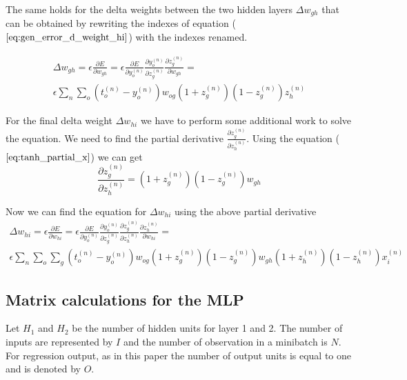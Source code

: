 The same holds for the delta weights between the two hidden layers $\Delta w_{gh}$ that can be obtained by rewriting the indexes of equation ($\ref{eq:gen_error_d_weight_hi}$) with the indexes renamed. 

\begin{multline} \label{eq:gen_dual_error_d_weight_gh}
\Delta w_{gh} = 
\epsilon \frac{\partial{E}}{\partial{w_{gh}}} = 
\epsilon \frac{\partial{E}}{\partial{y^{(n)}_{o}}} \frac{\partial{y^{(n)}_{o}}}{\partial{z^{(n)}_{g}}} \frac{\partial{z^{(n)}_{g}}}{\partial{w_{gh}}} = \\
\epsilon \sum_{n} \sum_{o}(t^{(n)}_{o}-y^{(n)}_{o}) w_{og} (1+z^{(n)}_{g})(1-z^{(n)}_{g}) z^{(n)}_{h}
\end{multline}

For the final delta weight  $\Delta w_{hi}$ we have to perform some additional work to solve the equation. We need to find the partial derivative $\frac{\partial{z^{(n)}_{g}}}{\partial{z^{(n)}_{h}}}$. Using the equation ($\ref{eq:tanh_partial_x}$) we can get
\begin{displaymath}
\frac{\partial{z^{(n)}_{g}}}{\partial{z^{(n)}_{h}}} = (1+z^{(n)}_{g})(1-z^{(n)}_{g}) w_{gh}
\end{displaymath}

Now we can find the equation for $\Delta w_{hi}$ using the above partial derivative
\begin{multline} \label{eq:gen_dual_error_d_weight_hi_final}
\Delta w_{hi}  = 
\epsilon \frac{\partial{E}}{\partial{w_{hi}}} = 
\epsilon \frac{\partial{E}}{\partial{y^{(n)}_{o}}} \frac{\partial{y^{(n)}_{o}}}{\partial{z^{(n)}_{g}}} \frac{\partial{z^{(n)}_{g}}}{\partial{z^{(n)}_{h}}} \frac{\partial{z^{(n)}_{h}}}{\partial{w_{hi}}} = \\
\epsilon \sum_{n} \sum_{o} \sum_{g} (t^{(n)}_{o}-y^{(n)}_{o}) w_{og} (1+z^{(n)}_{g})(1-z^{(n)}_{g}) w_{gh} (1+z^{(n)}_{h})(1-z^{(n)}_{h}) x^{(n)}_{i}
\end{multline}





\subsection{Matrix calculations for the MLP}
Let $H_{1}$ and $H_{2}$ be the number of hidden units for layer 1 and 2. The number of inputs are represented by $I$ and the number of observation in a minibatch is $N$. For regression output, as in this paper the number of output units is equal to one and is denoted by $O$.  

